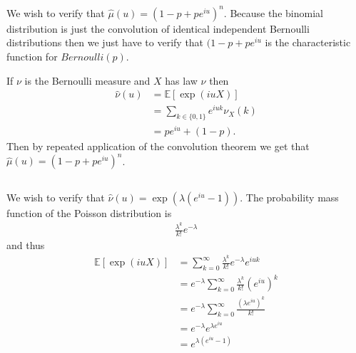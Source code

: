 \documentclass{unswmaths}
\begin{document}
\subsection{}
We wish to verify that $ \hat{\mu}(u) = (1 - p + pe^{iu})^n $. 
Because the binomial distribution is just the convolution of identical independent Bernoulli distributions then we just have to verify that $ (1 - p + pe^{iu} $ is the characteristic function for $Bernoulli(p)$.

If $ \nu $ is the Bernoulli measure and $ X $ has law $ \nu $ then 
\begin{align}
	\hat{\nu}(u) &= \mathbb{E}[ \exp(iuX)] \\
		&= \sum_{k \in \{ 0, 1\}} e^{iuk} \nu_{X}(k) \\
		&=  pe^{iu} + (1 - p).
\end{align}
Then by repeated application of the convolution theorem we get that
$ \hat{\mu}(u) = (1 - p + pe^{iu})^n $.

\subsection{}
We wish to verify that $ \hat{\nu}(u) = \exp(\lambda(e^{iu} - 1)) $. 
The probability mass function of the Poisson distribution is 
\begin{align}
	\frac{\lambda^k}{k!} e^{-\lambda} 
\end{align}
and thus
\begin{align}
	\mathbb{E}[ \exp(iuX) ] &= \sum_{k=0}^\infty \frac{\lambda^k}{k!} e^{-\lambda} e^{iuk} \\
		&= e^{-\lambda}\sum_{k=0}^\infty \frac{\lambda^k}{k!} (e^{iu})^k \\
		&= e^{-\lambda}\sum_{k=0}^\infty \frac{(\lambda e^{iu})^k}{k!} \\
		&= e^{-\lambda} e^{\lambda e^{iu}} \\
		&= e^{\lambda( e^{iu} - 1)}
\end{align}

\subsection{}
\end{document}
